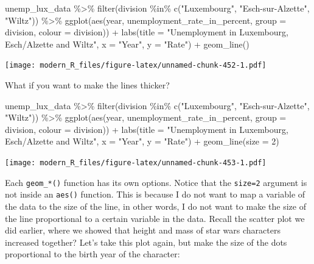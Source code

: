\documentclass[
]{article}
\newenvironment{Shaded}{\begin{snugshade}}{\end{snugshade}}
\newcommand{\AttributeTok}[1]{\textcolor[rgb]{0.77,0.63,0.00}{#1}}
\newcommand{\DecValTok}[1]{\textcolor[rgb]{0.00,0.00,0.81}{#1}}
\newcommand{\FunctionTok}[1]{\textcolor[rgb]{0.00,0.00,0.00}{#1}}
\newcommand{\NormalTok}[1]{#1}
\newcommand{\SpecialCharTok}[1]{\textcolor[rgb]{0.00,0.00,0.00}{#1}}
\newcommand{\StringTok}[1]{\textcolor[rgb]{0.31,0.60,0.02}{#1}}
\begin{document}
\begin{Shaded}
\begin{Highlighting}[]
\NormalTok{unemp\_lux\_data }\SpecialCharTok{\%\textgreater{}\%}
  \FunctionTok{filter}\NormalTok{(division }\SpecialCharTok{\%in\%} \FunctionTok{c}\NormalTok{(}\StringTok{"Luxembourg"}\NormalTok{, }\StringTok{"Esch{-}sur{-}Alzette"}\NormalTok{, }\StringTok{"Wiltz"}\NormalTok{)) }\SpecialCharTok{\%\textgreater{}\%}
  \FunctionTok{ggplot}\NormalTok{(}\FunctionTok{aes}\NormalTok{(year, unemployment\_rate\_in\_percent, }\AttributeTok{group =}\NormalTok{ division, }\AttributeTok{colour =}\NormalTok{ division)) }\SpecialCharTok{+}
  \FunctionTok{labs}\NormalTok{(}\AttributeTok{title =} \StringTok{"Unemployment in Luxembourg, Esch/Alzette and Wiltz"}\NormalTok{, }\AttributeTok{x =} \StringTok{"Year"}\NormalTok{, }\AttributeTok{y =} \StringTok{"Rate"}\NormalTok{) }\SpecialCharTok{+}
  \FunctionTok{geom\_line}\NormalTok{()}
\end{Highlighting}
\end{Shaded}

\texttt{[image: modern\_R\_files/figure-latex/unnamed-chunk-452-1.pdf]}

What if you want to make the lines thicker?

\begin{Shaded}
\begin{Highlighting}[]
\NormalTok{unemp\_lux\_data }\SpecialCharTok{\%\textgreater{}\%}
  \FunctionTok{filter}\NormalTok{(division }\SpecialCharTok{\%in\%} \FunctionTok{c}\NormalTok{(}\StringTok{"Luxembourg"}\NormalTok{, }\StringTok{"Esch{-}sur{-}Alzette"}\NormalTok{, }\StringTok{"Wiltz"}\NormalTok{)) }\SpecialCharTok{\%\textgreater{}\%}
  \FunctionTok{ggplot}\NormalTok{(}\FunctionTok{aes}\NormalTok{(year, unemployment\_rate\_in\_percent, }\AttributeTok{group =}\NormalTok{ division, }\AttributeTok{colour =}\NormalTok{ division)) }\SpecialCharTok{+}
  \FunctionTok{labs}\NormalTok{(}\AttributeTok{title =} \StringTok{"Unemployment in Luxembourg, Esch/Alzette and Wiltz"}\NormalTok{, }\AttributeTok{x =} \StringTok{"Year"}\NormalTok{, }\AttributeTok{y =} \StringTok{"Rate"}\NormalTok{) }\SpecialCharTok{+}
  \FunctionTok{geom\_line}\NormalTok{(}\AttributeTok{size =} \DecValTok{2}\NormalTok{)}
\end{Highlighting}
\end{Shaded}

\texttt{[image: modern\_R\_files/figure-latex/unnamed-chunk-453-1.pdf]}

Each \texttt{geom\_*()} function has its own options. Notice that the \texttt{size=2} argument is not inside
an \texttt{aes()} function. This is because I do not want to map a variable of the data to the size
of the line, in other words, I do not want to make the size of the line proportional to a certain
variable in the data. Recall the scatter plot we did earlier, where we showed that height and mass of
star wars characters increased together? Let's take this plot again, but make the size of the dots proportional
to the birth year of the character:
\end{document}
